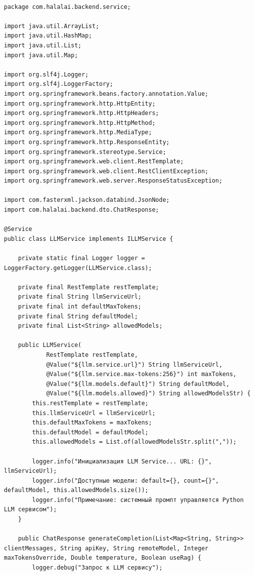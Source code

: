 \begin{lstlisting}[basicstyle=\tiny\ttfamily,breaklines=true]

package com.halalai.backend.service;

import java.util.ArrayList;
import java.util.HashMap;
import java.util.List;
import java.util.Map;

import org.slf4j.Logger;
import org.slf4j.LoggerFactory;
import org.springframework.beans.factory.annotation.Value;
import org.springframework.http.HttpEntity;
import org.springframework.http.HttpHeaders;
import org.springframework.http.HttpMethod;
import org.springframework.http.MediaType;
import org.springframework.http.ResponseEntity;
import org.springframework.stereotype.Service;
import org.springframework.web.client.RestTemplate;
import org.springframework.web.client.RestClientException;
import org.springframework.web.server.ResponseStatusException;

import com.fasterxml.jackson.databind.JsonNode;
import com.halalai.backend.dto.ChatResponse;

@Service
public class LLMService implements ILLMService {

    private static final Logger logger = LoggerFactory.getLogger(LLMService.class);

    private final RestTemplate restTemplate;
    private final String llmServiceUrl;
    private final int defaultMaxTokens;
    private final String defaultModel;
    private final List<String> allowedModels;

    public LLMService(
            RestTemplate restTemplate,
            @Value("${llm.service.url}") String llmServiceUrl,
            @Value("${llm.service.max-tokens:256}") int maxTokens,
            @Value("${llm.models.default}") String defaultModel,
            @Value("${llm.models.allowed}") String allowedModelsStr) {
        this.restTemplate = restTemplate;
        this.llmServiceUrl = llmServiceUrl;
        this.defaultMaxTokens = maxTokens;
        this.defaultModel = defaultModel;
        this.allowedModels = List.of(allowedModelsStr.split(","));

        logger.info("Инициализация LLM Service... URL: {}", llmServiceUrl);
        logger.info("Доступные модели: default={}, count={}", defaultModel, this.allowedModels.size());
        logger.info("Примечание: системный промпт управляется Python LLM сервисом");
    }

    public ChatResponse generateCompletion(List<Map<String, String>> clientMessages, String apiKey, String remoteModel, Integer maxTokensOverride, Double temperature, Boolean useRag) {
        logger.debug("Запрос к LLM сервису");
        

\end{lstlisting}
